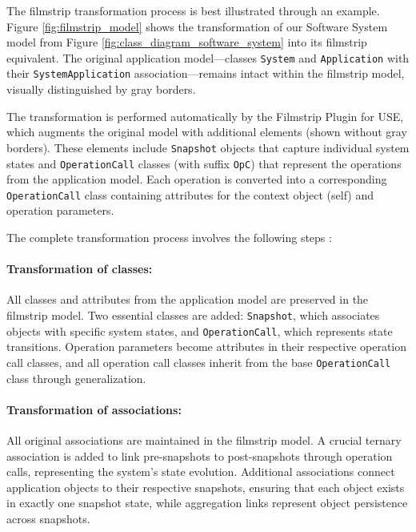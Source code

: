 The filmstrip transformation process is best illustrated through an example. 
Figure \ref{fig:filmstrip_model} shows the transformation of our Software System 
model from Figure \ref{fig:class_diagram_software_system} into its filmstrip 
equivalent. The original application model—classes \texttt{System} and 
\texttt{Application} with their \texttt{SystemApplication} association—remains 
intact within the filmstrip model, visually distinguished by gray borders.

The transformation is performed automatically by the Filmstrip Plugin for USE, which 
augments the original model with additional elements (shown without gray borders). 
These elements include \texttt{Snapshot} objects that capture individual system 
states and \texttt{OperationCall} classes (with suffix \texttt{OpC}) that represent 
the operations from the application model. Each operation is converted into a 
corresponding \texttt{OperationCall} class containing attributes for the context 
object (self) and operation parameters.

The complete transformation process involves the following steps \cite{Filmstripping}:
\vspace{-1.2em}
\paragraph{Transformation of classes:} All classes and attributes from the 
application model are preserved in the filmstrip model. Two essential classes are 
added: \texttt{Snapshot}, which associates objects with specific system states, 
and \texttt{OperationCall}, which represents state transitions. Operation parameters 
become attributes in their respective operation call classes, and all operation call 
classes inherit from the base \texttt{OperationCall} class through generalization.
\vspace{-1.2em}
\paragraph{Transformation of associations:} All original associations are maintained 
in the filmstrip model. A crucial ternary association is added to link pre-snapshots 
to post-snapshots through operation calls, representing the system's state evolution. 
Additional associations connect application objects to their respective snapshots, 
ensuring that each object exists in exactly one snapshot state, while aggregation 
links represent object persistence across snapshots.
\vspace{-1.2em}
